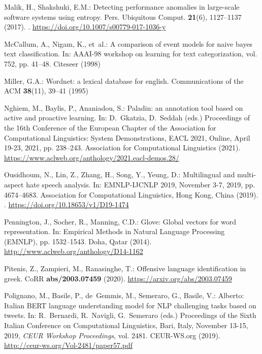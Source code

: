 \documentclass{article}
\begin{document}
\begin{thebibliography}{10}
Malik, H., Shakshuki, E.M.: Detecting performance anomalies in large-scale
  software systems using entropy.
\newblock Pers. Ubiquitous Comput. \textbf{21}(6), 1127--1137 (2017).
\newblock {}.
\newblock \urlprefix\url{https://doi.org/10.1007/s00779-017-1036-y}

McCallum, A., Nigam, K., et~al.: A comparison of event models for naive bayes
  text classification.
\newblock In: AAAI-98 workshop on learning for text categorization, vol. 752,
  pp. 41--48. Citeseer (1998)

Miller, G.A.: Wordnet: a lexical database for english.
\newblock Communications of the ACM \textbf{38}(11), 39--41 (1995)

Nghiem, M., Baylis, P., Ananiadou, S.: Paladin: an annotation tool based on
  active and proactive learning.
\newblock In: D.~Gkatzia, D.~Seddah (eds.) Proceedings of the 16th Conference
  of the European Chapter of the Association for Computational Linguistics:
  System Demonstrations, {EACL} 2021, Online, April 19-23, 2021, pp. 238--243.
  Association for Computational Linguistics (2021).
\newblock \urlprefix\url{https://www.aclweb.org/anthology/2021.eacl-demos.28/}

Ousidhoum, N., Lin, Z., Zhang, H., Song, Y., Yeung, D.: Multilingual and
  multi-aspect hate speech analysis.
\newblock In: {EMNLP-IJCNLP} 2019, November 3-7, 2019, pp. 4674--4683.
  Association for Computational Linguistics, Hong Kong, China (2019).
\newblock {}.
\newblock \urlprefix\url{https://doi.org/10.18653/v1/D19-1474}

Pennington, J., Socher, R., Manning, C.D.: Glove: Global vectors for word
  representation.
\newblock In: Empirical Methods in Natural Language Processing (EMNLP), pp.
  1532--1543. Doha, Qatar (2014).
\newblock \urlprefix\url{http://www.aclweb.org/anthology/D14-1162}

Pitenis, Z., Zampieri, M., Ranasinghe, T.: Offensive language identification in
  greek.
\newblock CoRR \textbf{abs/2003.07459} (2020).
\newblock \urlprefix\url{https://arxiv.org/abs/2003.07459}

Polignano, M., Basile, P., de~Gemmis, M., Semeraro, G., Basile, V.: Alberto:
  Italian {BERT} language understanding model for {NLP} challenging tasks based
  on tweets.
\newblock In: R.~Bernardi, R.~Navigli, G.~Semeraro (eds.) Proceedings of the
  Sixth Italian Conference on Computational Linguistics, Bari, Italy, November
  13-15, 2019, \emph{{CEUR} Workshop Proceedings}, vol. 2481. CEUR-WS.org
  (2019).
\newblock \urlprefix\url{http://ceur-ws.org/Vol-2481/paper57.pdf}


\end{thebibliography}
\end{document}
